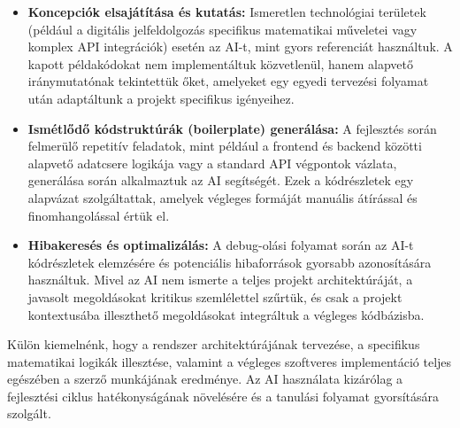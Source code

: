 \begin{itemize}
    \item \textbf{Koncepciók elsajátítása és kutatás:} Ismeretlen technológiai területek (például a digitális jelfeldolgozás specifikus matematikai műveletei vagy komplex API integrációk) esetén az AI-t, mint gyors referenciát használtuk. A kapott példakódokat nem implementáltuk közvetlenül, hanem alapvető iránymutatónak tekintettük őket, amelyeket egy egyedi tervezési folyamat után adaptáltunk a projekt specifikus igényeihez.
    \item \textbf{Ismétlődő kódstruktúrák (boilerplate) generálása:} A fejlesztés során felmerülő repetitív feladatok, mint például a frontend és backend közötti alapvető adatcsere logikája vagy a standard API végpontok vázlata, generálása során alkalmaztuk az AI segítségét. Ezek a kódrészletek egy alapvázat szolgáltattak, amelyek végleges formáját manuális átírással és finomhangolással értük el.
    \item \textbf{Hibakeresés és optimalizálás:} A debug-olási folyamat során az AI-t kódrészletek elemzésére és potenciális hibaforrások gyorsabb azonosítására használtuk. Mivel az AI nem ismerte a teljes projekt architektúráját, a javasolt megoldásokat kritikus szemlélettel szűrtük, és csak a projekt kontextusába illeszthető megoldásokat integráltuk a végleges kódbázisba.
\end{itemize}

Külön kiemelnénk, hogy a rendszer architektúrájának tervezése, a specifikus matematikai logikák illesztése, valamint a végleges szoftveres implementáció teljes egészében a szerző munkájának eredménye. Az AI használata kizárólag a fejlesztési ciklus hatékonyságának növelésére és a tanulási folyamat gyorsítására szolgált.
